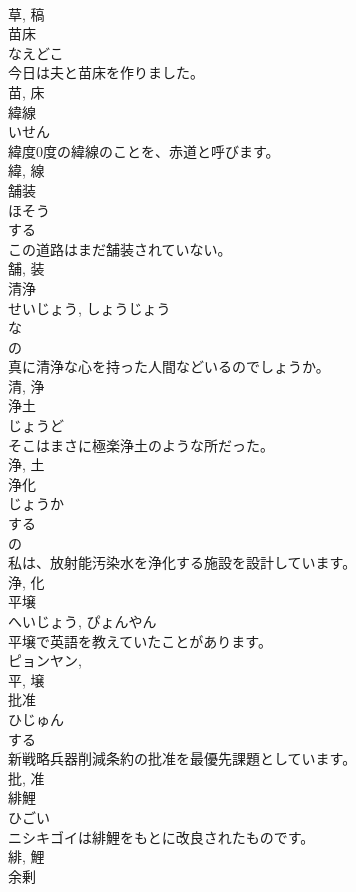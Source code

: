 \documentclass[8pt]{extreport}
\begin{document}
\begin{CJK}{UTF8}{min}
\\	草, 稿	
\\	苗床	
\\	なえどこ	
\\	今日は夫と苗床を作りました。	
\\	苗, 床	
\\	緯線	
\\	いせん	
\\	緯度0度の緯線のことを、赤道と呼びます。	
\\	緯, 線	
\\	舗装	
\\	ほそう	
\\	する 
\\	この道路はまだ舗装されていない。	
\\	舗, 装	
\\	清浄	
\\	せいじょう, しょうじょう	
\\	な 
\\	の 
\\	真に清浄な心を持った人間などいるのでしょうか。	
\\	清, 浄	
\\	浄土	
\\	じょうど	
\\	そこはまさに極楽浄土のような所だった。	
\\	浄, 土	
\\	浄化	
\\	じょうか	
\\	する 
\\	の 
\\	私は、放射能汚染水を浄化する施設を設計しています。	
\\	浄, 化	
\\	平壌	
\\	へいじょう, ぴょんやん	
\\	平壌で英語を教えていたことがあります。	
\\	ピョンヤン, 
\\	平, 壌	
\\	批准	
\\	ひじゅん	
\\	する 
\\	新戦略兵器削減条約の批准を最優先課題としています。	
\\	批, 准	
\\	緋鯉	
\\	ひごい	
\\	ニシキゴイは緋鯉をもとに改良されたものです。	
\\	緋, 鯉	
\\	余剰	

\end{CJK}
\end{document}
